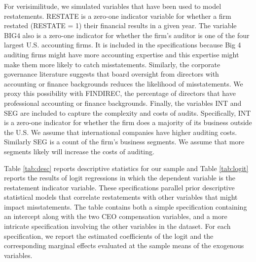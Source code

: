 \documentclass[12pt,reqno,titlepage]{amsart}
\theoremstyle{definition}
\begin{document}
\begin{doublespace}
For verisimilitude, we simulated variables that have been used to model restatements. 
RESTATE is a zero-one indicator variable for whether a firm restated (RESTATE = 1) their financial results in a given year.  
The variable BIG4 also is a zero-one indicator for whether the firm's auditor is one of the four largest U.S. accounting firms. 
It is included in the specifications because Big 4 auditing firms might have more accounting expertise and this expertise might make them more likely to catch misstatements. 
Similarly, the corporate governance literature suggests that board oversight from directors with accounting or finance backgrounds reduces the likelihood of misstatements. We proxy this possibility with FINDIREC, the percentage of directors that have professional accounting or finance backgrounds.
Finally, the variables INT and SEG are included to capture the complexity and costs of audits. 
Specifically, INT is a zero-one indicator for whether the firm does a majority of its business outside the U.S.
We assume that international companies have higher auditing costs. 
Similarly SEG is a count of the firm's business segments. 
We assume that more segments likely will increase the costs of auditing. 

Table \ref{tab:desc} reports descriptive statistics for our sample
and Table \ref{tab:logit} reports the results of logit regressions in which the dependent variable is the restatement indicator variable.
These specifications parallel prior descriptive statistical models that correlate restatements with other variables that might impact misstatements.
The table contains both a simple specification containing an intercept along with the two CEO  compensation variables, and a more intricate specification involving the other variables in the dataset.
For each specification, we report the estimated coefficients of the logit and the corresponding marginal effects evaluated at the sample means of the exogenous variables.


\end{doublespace}
\end{document}
